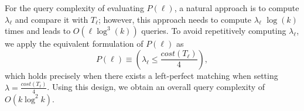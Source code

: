For the query complexity of evaluating $P(\ell)$, a natural approach is to compute  $\lambda_{\ell}$ and compare it with $T_{\ell}$; however, this approach needs to compute $\lambda_{\ell}$ $\log(k)$ times and leads to  $O(\ell \log^3(k))$ queries. To avoid repetitively computing $\lambda_{\ell}$, we apply the equivalent formulation of $P(\ell)$ as 
$$P(\ell)\equiv (\lambda_{\ell} \leq \frac{cost(T_{\ell})}{4}),$$
which holds precisely when there exists a left-perfect matching when setting $\lambda = \frac{cost(T_{\ell})}{4}$. Using this design, we obtain an overall query complexity of $O(k \log^2 k)$. 




